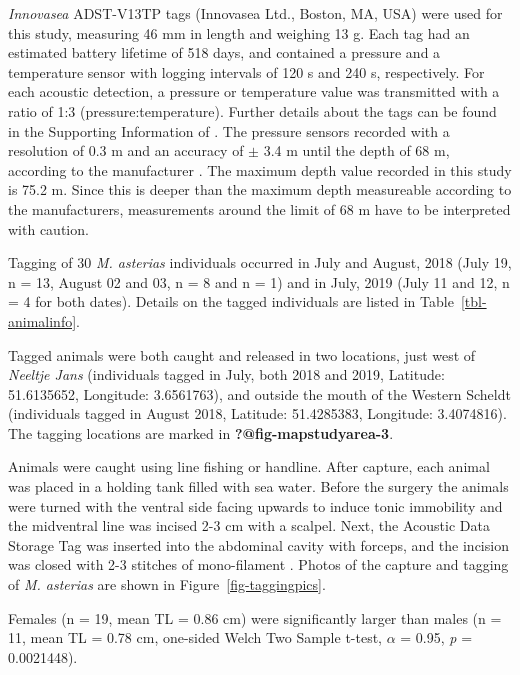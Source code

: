 \documentclass[
  authoryear,
  review,
  3p]{elsarticle}
\begin{document}
\emph{Innovasea} ADST-V13TP tags (Innovasea Ltd., Boston, MA, USA) were
used for this study, measuring 46 mm in length and weighing 13 g. Each
tag had an estimated battery lifetime of 518 days, and contained a
pressure and a temperature sensor with logging intervals of 120 s and
240 s, respectively. For each acoustic detection, a pressure or
temperature value was transmitted with a ratio of 1:3
(pressure:temperature). Further details about the tags can be found in
the Supporting Information of \citet{goossens_2023}. The pressure
sensors recorded with a resolution of 0.3 m and an accuracy of \(\pm\)
3.4 m until the depth of 68 m, according to the manufacturer
\citep{Innovasea_ADST}. The maximum depth value recorded in this study
is 75.2 m. Since this is deeper than the maximum depth measureable
according to the manufacturers, measurements around the limit of 68 m
have to be interpreted with caution.

Tagging of 30 \emph{M. asterias} individuals occurred in July and
August, 2018 (July 19, n = 13, August 02 and 03, n = 8 and n = 1) and in
July, 2019 (July 11 and 12, n = 4 for both dates). Details on the tagged
individuals are listed in Table~\ref{tbl-animalinfo}.

Tagged animals were both caught and released in two locations, just west
of \emph{Neeltje Jans} (individuals tagged in July, both 2018 and 2019,
Latitude: 51.6135652, Longitude: 3.6561763), and outside the mouth of
the Western Scheldt (individuals tagged in August 2018, Latitude:
51.4285383, Longitude: 3.4074816). The tagging locations are marked in
\textbf{?@fig-mapstudyarea-3}.

Animals were caught using line fishing or handline. After capture, each
animal was placed in a holding tank filled with sea water. Before the
surgery the animals were turned with the ventral side facing upwards to
induce tonic immobility \citep{kessel_2015} and the midventral line was
incised 2-3 cm with a scalpel. Next, the Acoustic Data Storage Tag was
inserted into the abdominal cavity with forceps, and the incision was
closed with 2-3 stitches of mono-filament \citep{goossens_2023}. Photos
of the capture and tagging of \emph{M. asterias} are shown in
Figure~\ref{fig-taggingpics}.

Females (n = 19, mean TL = 0.86 cm) were significantly larger than males
(n = 11, mean TL = 0.78 cm, one-sided Welch Two Sample t-test,
\(\alpha\) = 0.95, \emph{p} = 0.0021448).
\end{document}

